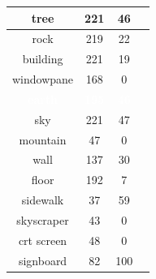\documentclass[12pt,a4paper,table,dvipsnames,tikz]{report}
\newcommand{\white}[1]{\textbf{\textcolor{white}{#1}}} %
\begin{document}
\begin{table}[h!]
\begin{subtable}[h!]{\textwidth}
\begin{tabular}{|c|c|c|c|}
				tree & 221 & 46 & \checkmark\\
				\hline
				rock & 219 & 22 & \checkmark\\
				\hline
				building & 221 & 19 & \checkmark\\
				\hline
				windowpane & 168 & 0 & \checkmark\\
				\hline
				\rowcolor{earth}
				\white{earth} & \white{195} & \white{46} & \white{\checkmark}\\
				\hline
				\rowcolor{sky}
				sky & 221 & 47 & \checkmark\\
				\hline
				mountain & 47 & 0 & \checkmark\\
				\hline
				wall & 137 & 30 & \checkmark\\
				\hline
				floor & 192 & 7 & \checkmark\\
				\hline
				sidewalk & 37 & 59 &\\
				\hline
				skyscraper & 43 & 0 & \checkmark\\
				\hline
				crt screen & 48 & 0 & \checkmark\\
				\hline
				signboard & 82 & 100 &\\
				\hline
			\end{tabular}
			\label{table:obst.f2}
		\end{subtable}
		\label{table:obst.folds}
	\end{table}
	
\end{document}
